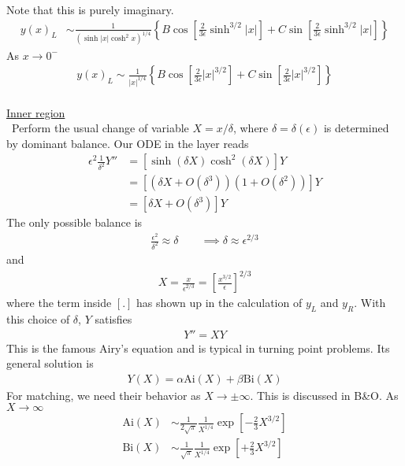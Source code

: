 Note that this is purely imaginary. 
\begin{align*}
	y(x)_L &\sim \frac{1}{(\sinh |x| \cosh^2 x)^{1/4}} \left\{ B \cos\left[\frac{2}{3\epsilon}\sinh^{3/2} |x|\right] +  C \sin\left[\frac{2}{3\epsilon}\sinh^{3/2} |x|\right]\right\}
\end{align*}
As $x \rightarrow 0^-$
\begin{align*}
	y(x)_L \sim \frac{1}{|x|^{1/4}} \left\{ B \cos \left[\frac{2}{3 \epsilon}|x|^{3/2}\right]  + C \sin \left[\frac{2}{3 \epsilon}|x|^{3/2}\right] \right\}
\end{align*} \\
\underline{Inner region} \\
\ \newline Perform the usual change of variable $X = x/\delta$, where $\delta = \delta(\epsilon)$ is determined by dominant balance. Our ODE in the layer reads
\begin{align*}
	\epsilon^2 \frac{1}{\delta^2} Y'' &= [\sinh (\delta X) \cosh^2(\delta X)] Y \\
	&= [(\delta X + O(\delta^3))(1 + O(\delta^2))] Y \\
	&=[\delta X + O(\delta^3)] Y
\end{align*}
The only possible balance is
\begin{align*}
	\frac{\epsilon^2}{\delta^2} \approx \delta \qquad
	\implies \delta \approx  \epsilon^{2/3}
\end{align*}
and
\begin{gather*}
	X = \frac{x}{\epsilon^{2/3}} = \left[\frac{x^{3/2}}{\epsilon}\right]^{2/3}
\end{gather*}
where the term inside $[.]$ has shown up in the calculation of $y_L$ and $y_R$. With this choice of $\delta$, $Y$ satisfies
\begin{gather*}
	Y'' = XY
\end{gather*}
This is the famous Airy's equation and is typical in turning point problems. Its general solution is
\begin{gather*}
	Y(X) = \alpha \mathrm{Ai}(X) + \beta \mathrm{Bi}(X)
\end{gather*} 
For matching, we need their behavior as $X \rightarrow \pm \infty$. This is discussed in B\&O. As $X \rightarrow \infty$
\begin{align*}
	\mathrm{Ai}(X) &\sim \frac{1}{2 \sqrt{\pi}} \frac{1}{X^{1/4}} \exp \left[-\frac{2}{3}X^{3/2} \right] \\
	\mathrm{Bi}(X) &\sim \frac{1}{\sqrt{\pi}} \frac{1}{X^{1/4}} \exp \left[+\frac{2}{3}X^{3/2} \right]
\end{align*}

